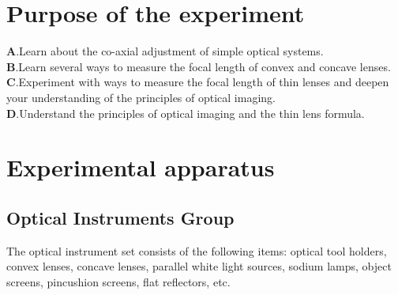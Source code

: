 \documentclass[UTF8]{article}
\begin{document}
	
	\section{Purpose of the experiment}
   $\bm{A}$.Learn about the co-axial adjustment of simple optical systems.\\
   $\bm{B}$.Learn several ways to measure the focal length of convex and concave lenses.\\
   $\bm{C}$.Experiment with ways to measure the focal length of thin lenses and deepen your understanding of the principles of optical imaging.\\
   $\bm{D}$.Understand the principles of optical imaging and the thin lens formula.
      

	\section{Experimental apparatus}
	
		\subsection{Optical Instruments Group}
		The optical instrument set consists of the following items: optical tool holders, convex lenses, concave lenses, parallel white light sources, sodium lamps, object screens, pincushion screens, flat reflectors, etc.
		
\end{document}
